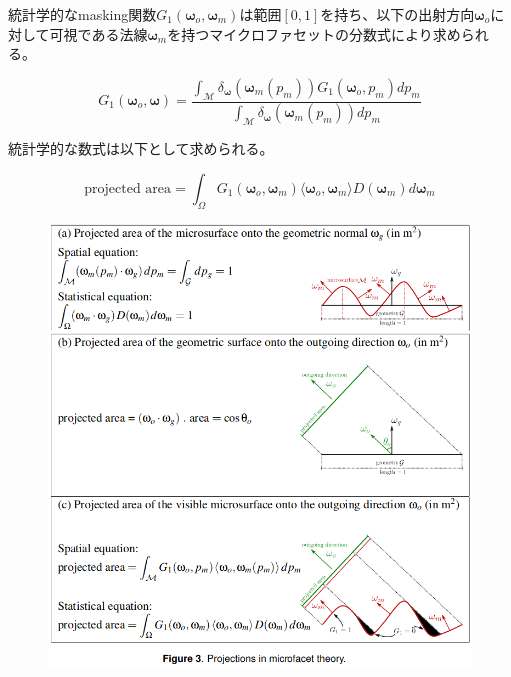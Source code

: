 \documentclass[a4j,xelatex,ja=standard]{bxjsarticle}
\begin{document}
統計学的なmasking関数$G_1(\boldsymbol{\omega}_o, \boldsymbol{\omega}_m)$は範囲$[0, 1]$を持ち、以下の出射方向$\boldsymbol{\omega}_o$に対して可視である法線$\boldsymbol{\omega}_m$を持つマイクロファセットの分数式により求められる。

\begin{equation}
    G_1(\boldsymbol{\omega}_o, \boldsymbol{\omega}) = \frac{\int_\mathcal{M}\delta_{\boldsymbol{\omega}}(\boldsymbol{\omega}_m(p_m))G_1(\boldsymbol{\omega}_o, p_m)dp_m}{\int_\mathcal{M}\delta_{\boldsymbol{\omega}}(\boldsymbol{\omega}_m(p_m))dp_m}
    \label{eq:12}
\end{equation}

統計学的な数式は以下として求められる。

\begin{equation}
    \text{projected area} = \int_\Omega G_1(\boldsymbol{\omega}_o, \boldsymbol{\omega}_m) \langle \boldsymbol{\omega}_o, \boldsymbol{\omega}_m \rangle D(\boldsymbol{\omega}_m) d\boldsymbol{\omega}_m
    \label{eq:13}
\end{equation}

\begin{figure}
    \includegraphics[width=\textwidth]{Figure3.png}
    \caption{}
    \label{fig:3}
\end{figure}
\end{document}
